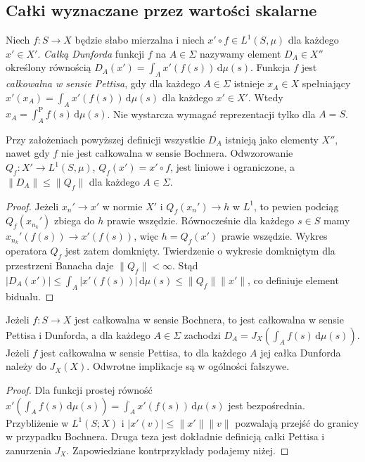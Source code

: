 \subsection{Całki wyznaczane przez wartości skalarne}

\begin{definicja}
\label{def:dunford-pettis15b}
Niech $f:S\to X$ będzie słabo mierzalna i niech
$x'\circ f\in L^1(S,\mu)$ dla każdego $x'\in X'$.
\emph{Całką Dunforda} funkcji $f$ na $A\in\Sigma$ nazywamy
element $D_A\in X''$ określony równością
$D_A(x')=\int_Ax'(f(s))\,\mathrm d\mu(s)$.
Funkcja $f$ jest \emph{całkowalna w sensie Pettisa}, gdy
dla każdego $A\in\Sigma$ istnieje $x_A\in X$ spełniający
$x'(x_A)=\int_Ax'(f(s))\,\mathrm d\mu(s)$ dla każdego
$x'\in X'$. Wtedy $x_A=\int_A^{\mathrm P} f(s)\,\mathrm d\mu(s)$.
Nie wystarcza wymagać reprezentacji tylko dla $A=S$.
\end{definicja}

\begin{twierdzenie}
\label{thm:dunford-closedgraph15b}
Przy założeniach powyższej definicji wszystkie $D_A$
istnieją jako elementy $X''$, nawet gdy $f$ nie jest
całkowalna w sensie Bochnera. Odwzorowanie
$Q_f:X'\to L^1(S,\mu)$, $Q_f(x')=x'\circ f$, jest
liniowe i ograniczone, a
$\|D_A\|\le\|Q_f\|$ dla każdego $A\in\Sigma$.
\end{twierdzenie}
\begin{proof}
Jeżeli $x_n'\to x'$ w normie $X'$ i
$Q_f(x_n')\to h$ w $L^1$, to pewien podciąg
$Q_f(x_{n_k}')$ zbiega do $h$ prawie wszędzie.
Równocześnie dla każdego $s\in S$ mamy
$x_{n_k}'(f(s))\to x'(f(s))$, więc $h=Q_f(x')$ prawie
wszędzie. Wykres operatora $Q_f$ jest zatem domknięty.
Twierdzenie o wykresie domkniętym dla przestrzeni Banacha
daje $\|Q_f\|<\infty$. Stąd
$|D_A(x')|\le\int_A|x'(f(s))|\,\mathrm d\mu(s)
\le\|Q_f\|\|x'\|$, co definiuje element bidualu.
\end{proof}

\begin{twierdzenie}
\label{thm:hierarchy-integrals15b}
Jeżeli $f:S\to X$ jest całkowalna w sensie Bochnera,
to jest całkowalna w sensie Pettisa i Dunforda, a dla
każdego $A\in\Sigma$ zachodzi
$D_A=J_X(\int_A f(s)\,\mathrm d\mu(s))$.
Jeżeli $f$ jest całkowalna w sensie Pettisa, to dla każdego
$A$ jej całka Dunforda należy do $J_X(X)$.
Odwrotne implikacje są w ogólności fałszywe.
\end{twierdzenie}
\begin{proof}
Dla funkcji prostej równość
$x'(\int_A f(s)\,\mathrm d\mu(s))=\int_Ax'(f(s))\,\mathrm d\mu(s)$
jest bezpośrednia. Przybliżenie w $L^1(S;X)$
i $|x'(v)|\le\|x'\|\|v\|$ pozwalają przejść do granicy
w przypadku Bochnera. Druga teza jest dokładnie definicją
całki Pettisa i zanurzenia $J_X$. Zapowiedziane
kontrprzykłady podajemy niżej.
\end{proof}

